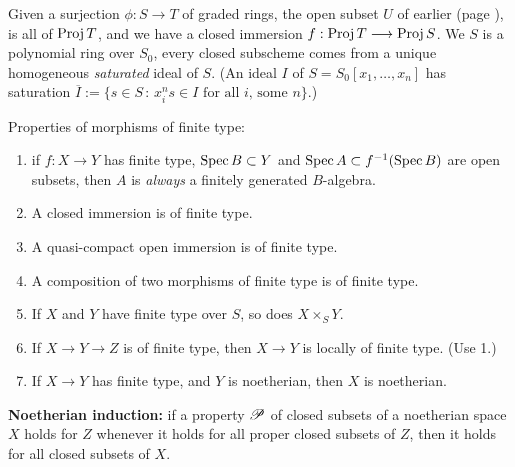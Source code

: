 \documentclass[11pt]{article}
\newcommand{\Index}[1]{\index{#1}#1}
\begin{document}
\begin{itemise}
\item Given a surjection $\phi:S\to T$ of graded rings, the open subset $U$ of
earlier (page \pageref{mapsofprojs}), is all of $\operatorname{Proj} T$, and we have a closed
immersion $f:\operatorname{Proj} T\longrightarrow\operatorname{Proj} S$. We $S$ is a polynomial ring over $S_0$, every
closed subscheme comes from a unique homogeneous \emph{saturated} ideal of $S$.
{\small(An ideal $I$ of $S=S_0[x_1,\ldots,x_n]$ has saturation $\overline
I:=\{s\in S\,:\,x^n_is\in I\text{\ for all $i$, some $n$}\}$.)}
\item Properties of morphisms of \Index{finite type}:
\begin{enumerate}\squishlist
\item if $f:X\to Y$ has finite type, $\operatorname{Spec} B\subset Y$ and $\operatorname{Spec} A\subset
f^{-1}(\operatorname{Spec} B)$ are open subsets, then $A$ is \emph{always} a finitely
generated $B$-algebra.
\item A closed immersion is of finite type. 
\item A quasi-compact open immersion is of finite type. 
\item A composition of two morphisms of finite type is of finite type. 
\item If $X$ and $Y$ have finite type over $S$, so does $X\times_SY$. 
\item If $X\to Y\to Z$ is of finite type, then $X\to Y$ is locally of finite
type. {\small(Use 1.)}
\item If $X\to Y$ has finite type, and $Y$ is \Index{noetherian}, then $X$ is
noetherian.
\end{enumerate}
\item \textbf{Noetherian induction:} if a property
$\mathscr{P}$ of closed subsets of a noetherian space $X$ holds for $Z$ whenever it
holds for all proper closed subsets of $Z$, then it holds for all closed subsets
of $X$.
\end{itemise}
\end{document}
